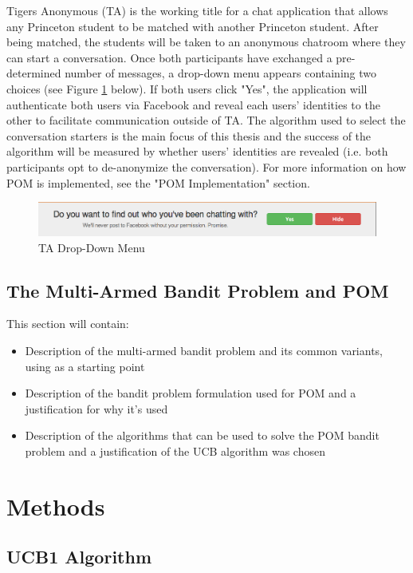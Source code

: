 \documentclass{article}
\begin{document}
Tigers Anonymous (TA) is the working title for a chat application that allows any Princeton student to be matched with another Princeton student. After being matched, the students will be taken to an anonymous chatroom where they can start a conversation. Once both participants have exchanged a pre-determined number of messages, a drop-down menu appears containing two choices (see Figure \ref{fig:DropDownMenu} below). If both users click "Yes", the application will authenticate both users via Facebook and reveal each users' identities to the other to facilitate communication outside of TA. The algorithm used to select the conversation starters is the main focus of this thesis and the success of the algorithm will be measured by whether users' identities are revealed (i.e. both participants opt to de-anonymize the conversation). For more information on how POM is implemented, see the "POM Implementation" section.

\begin{figure}[h]
\centering
\includegraphics[trim= 0mm 0mm 2mm 2mm, clip, scale=0.36]{./Pictures/DropDownMenu}
\caption{TA Drop-Down Menu}
\label{fig:DropDownMenu}
\end{figure}

\subsection{The Multi-Armed Bandit Problem and POM}

This section will contain: 
\begin{itemize}
\item Description of the multi-armed bandit problem and its common variants, using \citet{bubeck12} as a starting point
\item Description of the bandit problem formulation used for POM and a justification for why it's used
\item Description of the algorithms that can be used to solve the POM bandit problem and a justification of the UCB algorithm was chosen
\end{itemize}

\section{Methods}

\subsection{UCB1 Algorithm}
\end{document}
